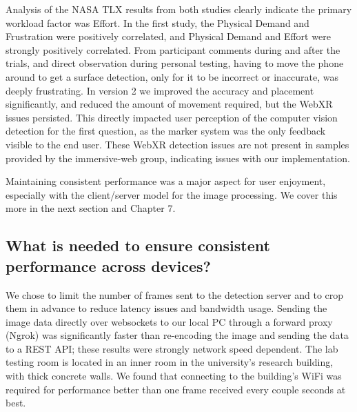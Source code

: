 \documentclass[thesis]{fputhesis}
\begin{document}
\begin{body}
Analysis of the NASA TLX results from both studies clearly indicate the primary workload factor was Effort. In the first study, the Physical Demand and Frustration were positively correlated, and Physical Demand and Effort were strongly positively correlated. From participant comments during and after the trials, and direct observation during personal testing, having to move the phone around to get a surface detection, only for it to be incorrect or inaccurate, was deeply frustrating. In version 2 we improved the accuracy and placement significantly, and reduced the amount of movement required, but the WebXR issues persisted. This directly impacted user perception of the computer vision detection for the first question, as the marker system was the only feedback visible to the end user. These WebXR detection issues are not present in samples provided by the immersive-web group, indicating issues with our implementation.

Maintaining consistent performance was a major aspect for user enjoyment, especially with the client/server model for the image processing. We cover this more in the next section and Chapter 7.

\subsection{What is needed to ensure consistent performance across devices?}
We chose to limit the number of frames sent to the detection server and to crop them in advance to reduce latency issues and bandwidth usage. Sending the image data directly over websockets to our local PC through a forward proxy (Ngrok) was significantly faster than re-encoding the image and sending the data to a REST API; these results were strongly network speed dependent. The lab testing room is located in an inner room in the university's research building, with thick concrete walls. We found that connecting to the building's WiFi was required for performance better than one frame received every couple seconds at best. 


\end{body}
\end{document}
